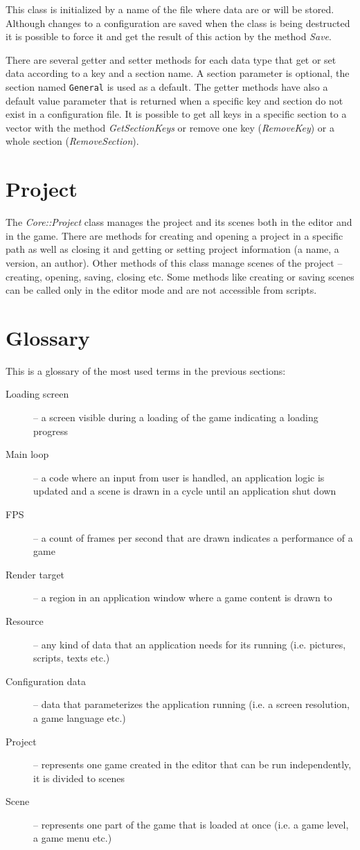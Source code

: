 \documentclass[a4paper, 12pt]{report}
\begin{document}
This class is initialized by a name of the file where data are or will be stored. Although changes to a configuration are saved when the class is being destructed it is possible to force it and get the result of this action by the method \emph{Save}.

There are several getter and setter methods for each data type that get or set data according to a key and a section name. A section parameter is optional, the section named \verb|General| is used as a default. The getter methods have also a default value parameter that is returned when a specific key and section do not exist in a configuration file. It is possible to get all keys in a specific section to a vector with the method \emph{GetSectionKeys} or remove one key (\emph{RemoveKey}) or a whole section (\emph{RemoveSection}).

\section{Project}

The \emph{Core::Project} class manages the project and its scenes both in the editor and in the game. There are methods for creating and opening a project in a specific path as well as closing it and getting or setting project information (a name, a version, an author). Other methods of this class manage scenes of the project -- creating, opening, saving, closing etc. Some methods like creating or saving scenes can be called only in the editor mode and are not accessible from scripts.

\section{Glossary}
This is a glossary of the most used terms in the previous sections:

\begin{description}
  \item[Loading screen] -- a screen visible during a loading of the game indicating a loading progress
  \item[Main loop] -- a code where an input from user is handled, an application logic is updated and a scene is drawn in a cycle until an application shut down
  \item[FPS] -- a count of frames per second that are drawn indicates a performance of a game
  \item[Render target] -- a region in an application window where a game content is drawn to
  \item[Resource] -- any kind of data that an application needs for its running (i.e. pictures, scripts, texts etc.)
  \item[Configuration data] -- data that parameterizes the application running (i.e. a screen resolution, a game language etc.)
  \item[Project] -- represents one game created in the editor that can be run independently, it is divided to scenes
  \item[Scene] -- represents one part of the game that is loaded at once (i.e. a game level, a game menu etc.)
\end{description}
\end{document}
